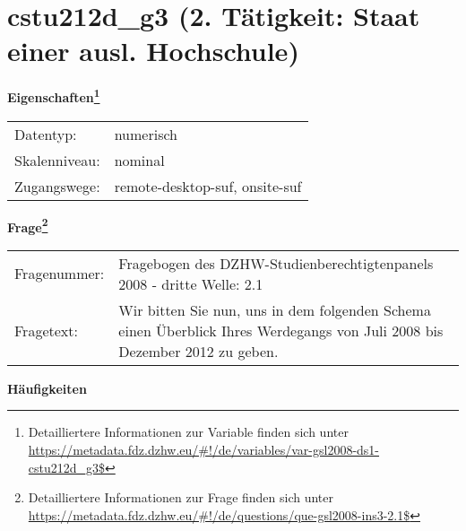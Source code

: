 
    \setcounter{footnote}{0}

    \vspace*{-1.8cm}
	\section{cstu212d\_g3 (2. Tätigkeit: Staat einer ausl. Hochschule)}
	\label{section:cstu212d_g3}



    \vspace*{0.5cm}
    \noindent\textbf{Eigenschaften\footnote{Detailliertere Informationen zur Variable finden sich unter
		\url{https://metadata.fdz.dzhw.eu/\#!/de/variables/var-gsl2008-ds1-cstu212d_g3$}}}\\
	\begin{tabularx}{\hsize}{@{}lX}
	Datentyp: & numerisch \\
	Skalenniveau: & nominal \\
	Zugangswege: &
	  remote-desktop-suf, 
	  onsite-suf
 \\
    \end{tabularx}



				\vspace*{0.5cm}
                \noindent\textbf{Frage\footnote{Detailliertere Informationen zur Frage finden sich unter
		              \url{https://metadata.fdz.dzhw.eu/\#!/de/questions/que-gsl2008-ins3-2.1$}}}\\
				\begin{tabularx}{\hsize}{@{}lX}
					Fragenummer: &
					  Fragebogen des DZHW-Studienberechtigtenpanels 2008 - dritte Welle:
					  2.1
 \\
					Fragetext: & Wir bitten Sie nun, uns in dem folgenden Schema einen Überblick Ihres Werdegangs von Juli 2008 bis Dezember 2012 zu geben. \\
				\end{tabularx}





        		\vspace*{0.5cm}
                \noindent\textbf{Häufigkeiten}

